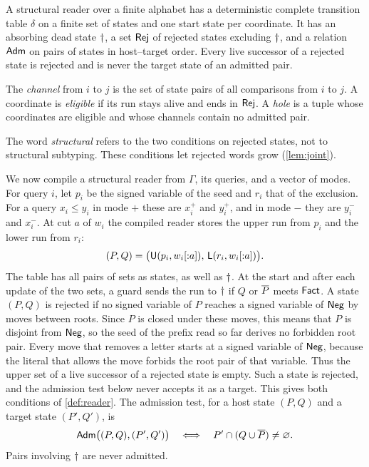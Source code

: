 \begin{definition}\label{def:reader}
A structural reader over a finite alphabet has a deterministic complete
transition table $\delta$ on a finite set of states and one start state per
coordinate. It has an absorbing dead state $\dagger$, a set $\mathsf{Rej}$ of
rejected states excluding $\dagger$, and a relation $\mathsf{Adm}$ on
pairs of states in host--target order. Every live successor of a rejected
state is rejected and is never the target state of an admitted pair.

The \emph{channel} from $i$ to $j$ is the set of state pairs of all
comparisons from $i$ to $j$. A coordinate is \emph{eligible} if its run
stays alive and ends in $\mathsf{Rej}$. A \emph{hole} is a tuple whose coordinates
are eligible and whose channels contain no admitted pair.
\end{definition}

The word \emph{structural} refers to the two conditions on rejected states,
not to structural subtyping. These conditions let rejected words grow
(\cref{lem:joint}).

We now compile a structural reader from $\Gamma$, its queries, and a vector
of modes. For query $i$, let $p_i$ be the signed variable of the seed and
$r_i$ that of the exclusion. For a query $x_i\le y_i$ in mode $+$ these are
$x_i^+$ and $y_i^+$, and in mode $-$ they are $y_i^-$ and $x_i^-$. At cut
$a$ of $w_i$ the compiled reader stores the upper run from $p_i$ and the
lower run from $r_i$:
\[
   (P,Q)=\bigl(\mathsf U(p_i,w_i[{:}a]),\,\mathsf L(r_i,w_i[{:}a])\bigr).
\]
The table has all pairs of sets as states, as well as $\dagger$.
At the start and after each update of the two sets, a guard sends
the run to $\dagger$ if $Q$ or $\overline{P}$ meets $\mathsf{Fact}$. A state $(P,Q)$ is
rejected if no signed variable of $P$ reaches a signed variable of $\mathsf{Neg}$
by moves between roots. Since $P$ is closed under these moves, this means
that $P$ is disjoint from $\mathsf{Neg}$, so the seed of the prefix read so far
derives no forbidden root pair. Every move that removes a letter starts at
a signed variable of $\mathsf{Neg}$, because the literal that allows the move
forbids the root pair of that variable. Thus the upper set of a live
successor of a rejected state is empty. Such a state is rejected, and the
admission test below never accepts it as a target. This gives both
conditions of \cref{def:reader}. The admission test, for a host state
$(P,Q)$ and a target state $(P',Q')$, is
\begin{equation}
 \mathsf{Adm}\bigl((P,Q),(P',Q')\bigr)
 \quad\Longleftrightarrow\quad
 P'\cap(Q\cup\overline{P})\ne\varnothing .
 \label{eq:admission}
\end{equation}
Pairs involving $\dagger$ are never admitted.

